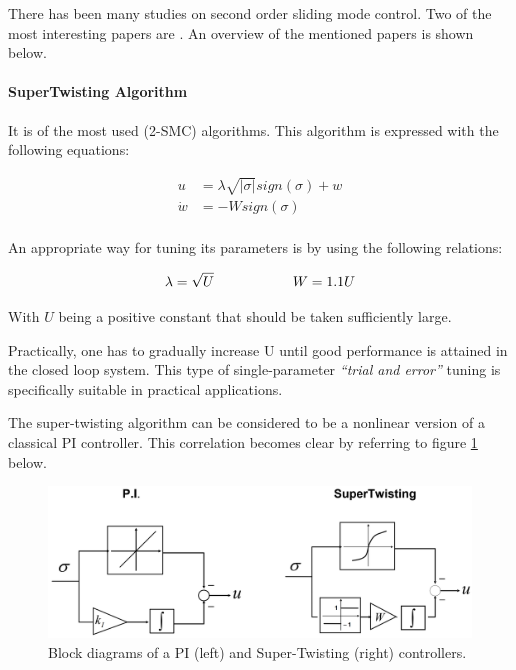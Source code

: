 \documentclass{thesisreport}
\begin{document}
There has been many studies on second order sliding mode control. Two of the most interesting papers are \cite{Levant1993, Bartolini1999}. An overview of the mentioned papers is shown below.


\paragraph{SuperTwisting Algorithm}

It is of the most used (2-SMC) algorithms. This algorithm is expressed with the following equations:

\begin{equation}
\begin{aligned}
	u &= \lambda \sqrt{|\sigma|}sign(\sigma) + w \\
	\dot{w} &= -W sign (\sigma) \\
\end{aligned}
\end{equation}


									
An appropriate way for tuning its parameters is by using the following relations: 

\begin{equation}
\lambda = \sqrt{U} \text{\hspace{2cm}} W = 1.1U
\end{equation}



\noindent With $U$ being a positive constant that should be taken sufficiently large.



\noindent Practically, one has to gradually increase U until good performance is attained in the closed loop system. This type of single-parameter \textit{“trial and error”} tuning is specifically suitable in practical applications.

\noindent The super-twisting algorithm can be considered to be a nonlinear version of a classical PI controller. This correlation becomes clear by referring to figure \ref{PI_SuperTwisting} below.

\begin{figure}[h]
\centering
\includegraphics[width=\textwidth]{Images/Control/PI_SuperTwisting}
\caption{Block diagrams of a PI (left) and Super-Twisting (right) controllers.\cite{DeCarlo2008}}
\label{PI_SuperTwisting}
\end{figure}
\end{document}
